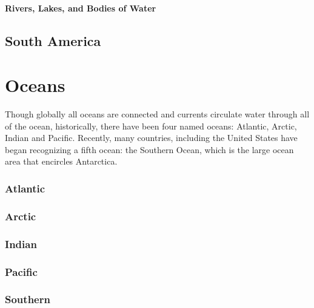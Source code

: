 			\paragraph{Rivers, Lakes, and Bodies of Water}
		
			
	\subsection{South America}


	\section{Oceans}
		Though globally all oceans are connected and currents circulate water through all of the ocean, historically, there have been four named oceans: Atlantic, Arctic, Indian and Pacific. Recently, many countries, including the United States have began recognizing a fifth ocean: the Southern Ocean, which is the large ocean area that encircles Antarctica.  
		\subsubsection{Atlantic}
		\subsubsection{Arctic}
		\subsubsection{Indian}
		\subsubsection{Pacific}
		\subsubsection{Southern}
		
		
